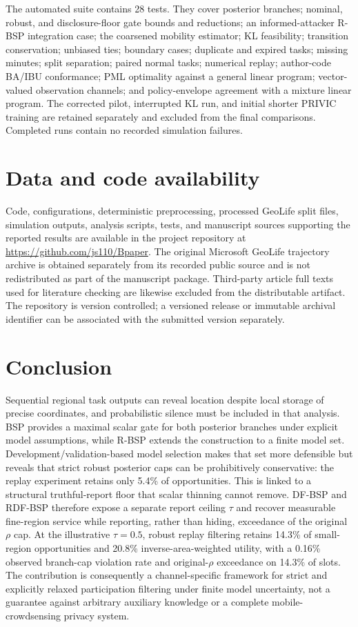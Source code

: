 \documentclass[review,12pt]{elsarticle}
\begin{document}
The automated suite contains 28 tests. They cover posterior branches; nominal, robust, and disclosure-floor gate bounds and reductions; an informed-attacker R-BSP integration case; the coarsened mobility estimator; KL feasibility; transition conservation; unbiased ties; boundary cases; duplicate and expired tasks; missing minutes; split separation; paired normal tasks; numerical replay; author-code BA/IBU conformance; PML optimality against a general linear program; vector-valued observation channels; and policy-envelope agreement with a mixture linear program. The corrected pilot, interrupted KL run, and initial shorter PRIVIC training are retained separately and excluded from the final comparisons. Completed runs contain no recorded simulation failures.

\section*{Data and code availability}
Code, configurations, deterministic preprocessing, processed GeoLife split files, simulation outputs, analysis scripts, tests, and manuscript sources supporting the reported results are available in the project repository at \url{https://github.com/js110/Bpaper}. The original Microsoft GeoLife trajectory archive is obtained separately from its recorded public source and is not redistributed as part of the manuscript package. Third-party article full texts used for literature checking are likewise excluded from the distributable artifact. The repository is version controlled; a versioned release or immutable archival identifier can be associated with the submitted version separately.

\section{Conclusion}
Sequential regional task outputs can reveal location despite local storage of precise coordinates, and probabilistic silence must be included in that analysis. BSP provides a maximal scalar gate for both posterior branches under explicit model assumptions, while R-BSP extends the construction to a finite model set. Development/validation-based model selection makes that set more defensible but reveals that strict robust posterior caps can be prohibitively conservative: the replay experiment retains only 5.4\% of opportunities. This is linked to a structural truthful-report floor that scalar thinning cannot remove. DF-BSP and RDF-BSP therefore expose a separate report ceiling $\tau$ and recover measurable fine-region service while reporting, rather than hiding, exceedance of the original $\rho$ cap. At the illustrative $\tau=0.5$, robust replay filtering retains 14.3\% of small-region opportunities and 20.8\% inverse-area-weighted utility, with a 0.16\% observed branch-cap violation rate and original-$\rho$ exceedance on 14.3\% of slots. The contribution is consequently a channel-specific framework for strict and explicitly relaxed participation filtering under finite model uncertainty, not a guarantee against arbitrary auxiliary knowledge or a complete mobile-crowdsensing privacy system.
\end{document}
